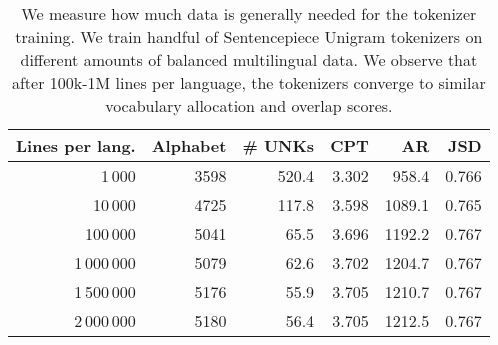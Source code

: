 \begin{table}
\caption{We measure how much data is generally needed for the tokenizer training. We train handful of Sentencepiece Unigram tokenizers on different amounts of balanced multilingual data. We observe that after 100k-1M lines per language, the tokenizers converge to similar vocabulary allocation and overlap scores.}
\label{tab:data_size_influence}
\begin{tabular}{rrrrrr}
\toprule
Lines per lang. & Alphabet & \# UNKs & CPT & AR & JSD \\
\midrule
1\,000 & 3598 & 520.4 & 3.302 & 958.4 & 0.766 \\
10\,000 & 4725 & 117.8 & 3.598 & 1089.1 & 0.765 \\
100\,000 & 5041 & 65.5 & 3.696 & 1192.2 & 0.767 \\
1\,000\,000 & 5079 & 62.6 & 3.702 & 1204.7 & 0.767 \\
1\,500\,000 & 5176 & 55.9 & 3.705 & 1210.7 & 0.767 \\
2\,000\,000 & 5180 & 56.4 & 3.705 & 1212.5 & 0.767 \\
\bottomrule
\end{tabular}
\end{table}
